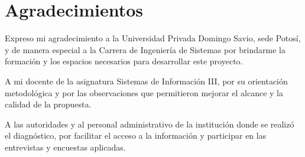 \chapter*{Agradecimientos}
\thispagestyle{plain}

Expreso mi agradecimiento a la Universidad Privada Domingo Savio, sede
Potosí, y de manera especial a la Carrera de Ingeniería de Sistemas por
brindarme la formación y los espacios necesarios para desarrollar este
proyecto.

A mi docente de la asignatura Sistemas de Información III, por su
orientación metodológica y por las observaciones que permitieron mejorar
el alcance y la calidad de la propuesta.

A las autoridades y al personal administrativo de la institución donde se
realizó el diagnóstico, por facilitar el acceso a la información y
participar en las entrevistas y encuestas aplicadas.

